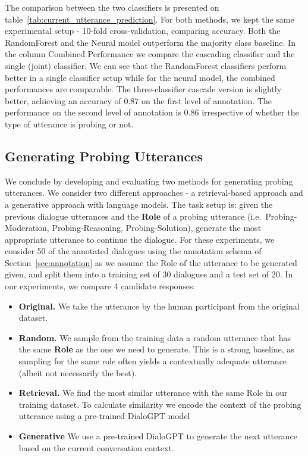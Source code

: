 \documentclass[acmsmall,manuscript,screen]{acmart}
\newcommand\newtext[1]{\textcolor{black}{#1}}
\begin{document}
The comparison between the two classifiers is presented on table~\ref{tab:current_utterance_prediction}. For both methods, we kept the same experimental setup - 10-fold cross-validation, comparing accuracy. Both the RandomForest and the Neural model outperform the majority class baseline. 
In the column Combined Performance we compare the cascading classifier and the single (joint) classifier.
We can see that the RandomForest classifiers perform better in a single classifier setup while for the neural model, the combined performances are comparable. The three-classifier cascade version is slightly better, achieving \newtext{an} accuracy of 0.87 on the first level of annotation. The performance on the second level of annotation is 0.86 irrespective of whether the type of utterance is probing or not.




\subsection{Generating Probing Utterances}
\label{ssec:generation}



We conclude by developing and evaluating two methods for generating probing utterances. 
We consider
two different approaches - a retrieval-based approach and a generative approach with language models.
The task setup is: given the previous dialogue utterances and the \textbf{Role} of a probing utterance (i.e.\ Probing-Moderation, Probing-Reasoning, Probing-Solution), generate the most appropriate utterance to continue the dialogue.
For these experiments, we consider 50 of the annotated dialogues using the annotation schema of Section~\ref{sec:annotation} as we assume the Role of the utterance to be generated given,
and split them into a training set of 30 dialogues and a test set of 20.
In our experiments, we compare 4 candidate responses:

\begin{itemize}[noitemsep,nolistsep]
    \item \textbf{Original.} We take the utterance by the human participant from the original dataset.
    \item \textbf{Random.} We sample from the training data a random utterance that has the same \textbf{Role} as the one we need to generate. This is a strong baseline, as sampling for the same role often yields a contextually adequate utterance (albeit not necessarily the best). 
    \item \textbf{Retrieval.} We find the most similar utterance with the same Role in our training dataset. To calculate similarity we encode the context of the probing utterance using a \newtext{pre-trained} DialoGPT model  
    \item \textbf{Generative} We use a \newtext{pre-trained} DialoGPT to generate the next utterance based on the current conversation context.
\end{itemize}
\end{document}
